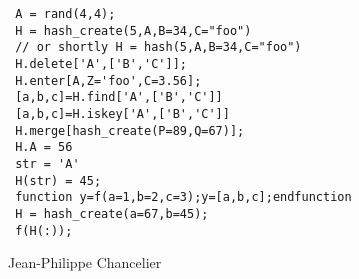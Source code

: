 \begin{examples}
\begin{Verbatim}
 A = rand(4,4);
 H = hash_create(5,A,B=34,C="foo")  
 // or shortly H = hash(5,A,B=34,C="foo")
 H.delete['A',['B','C']];
 H.enter[A,Z='foo',C=3.56];
 [a,b,c]=H.find['A',['B','C']]
 [a,b,c]=H.iskey['A',['B','C']]
 H.merge[hash_create(P=89,Q=67)];
 H.A = 56 
 str = 'A'
 H(str) = 45;
 function y=f(a=1,b=2,c=3);y=[a,b,c];endfunction 
 H = hash_create(a=67,b=45);
 f(H(:));
\end{Verbatim}
\end{examples}

\begin{authors}
  Jean-Philippe Chancelier
\end{authors}
